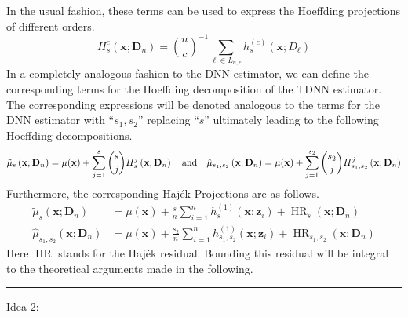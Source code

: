 In the usual fashion, these terms can be used to express the Hoeffding projections of different orders.
\begin{equation}
	H_{s}^{c}\left(\mathbf{x}; \mathbf{D}_n\right)
	= \binom{n}{c}^{-1} \sum_{\ell \in L_{n,c}} h^{(c)}_{s}(\mathbf{x}; D_{\ell})
\end{equation}
In a completely analogous fashion to the DNN estimator, we can define the corresponding terms for the Hoeffding decomposition of the TDNN estimator.
The corresponding expressions will be denoted analogous to the terms for the DNN estimator with ``$s_1, s_2$'' replacing ``$s$'' ultimately leading to the following Hoeffding decompositions.
\begin{equation}
	\tilde{\mu}_{s}\left(\mathbf{x}; \mathbf{D}_n\right)
	= \mu(\mathbf{x}) + \sum_{j = 1}^{s}\binom{s}{j}H_{s}^{j}\left(\mathbf{x}; \mathbf{D}_n\right)\\
	\quad \text{and} \quad
	\hat{\mu}_{s_1, s_2}\left(\mathbf{x}; \mathbf{D}_n\right)
	= \mu(\mathbf{x}) + \sum_{j = 1}^{s_2}\binom{s_2}{j}H_{s_1, s_2}^{j}\left(\mathbf{x}; \mathbf{D}_n\right)
\end{equation}
Furthermore, the corresponding Haj\'ek-Projections are as follows.
\begin{equation}
	\begin{aligned}
		\tilde{\mu}_{s}\left(\mathbf{x}; \mathbf{D}_n\right)
		 & = \mu(\mathbf{x}) + \frac{s}{n}\sum_{i = 1}^{n}h^{(1)}_{s}(\mathbf{x}; \mathbf{z}_{i})
		+ \operatorname{HR}_{s}(\mathbf{x}; \mathbf{D}_n)                                                   \\
		\hat{\mu}_{s_1, s_2}\left(\mathbf{x}; \mathbf{D}_n\right)
		 & = \mu(\mathbf{x}) + \frac{s_2}{n}\sum_{i = 1}^{n} h^{(1)}_{s_1, s_2}(\mathbf{x}; \mathbf{z}_{i})
		+ \operatorname{HR}_{s_1, s_2}(\mathbf{x}; \mathbf{D}_n)
	\end{aligned}
\end{equation}
Here $\operatorname{HR}$ stands for the Haj\'ek residual.
Bounding this residual will be integral to the theoretical arguments made in the following.

\hrule

{\color{red} Idea 2:}


